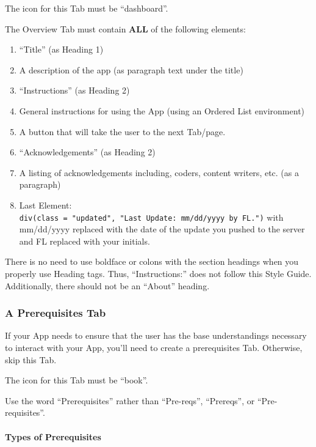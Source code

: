 \documentclass[
]{book}
\providecommand{\tightlist}{%
  \setlength{\itemsep}{0pt}\setlength{\parskip}{0pt}}
\begin{document}
The icon for this Tab must be ``dashboard''.

The Overview Tab must contain \textbf{ALL} of the following elements:

\begin{enumerate}
\def\labelenumi{\arabic{enumi}.}
\tightlist
\item
  ``Title'' (as Heading 1)
\item
  A description of the app (as paragraph text under the title)
\item
  ``Instructions'' (as Heading 2)
\item
  General instructions for using the App (using an Ordered List environment)
\item
  A button that will take the user to the next Tab/page.
\item
  ``Acknowledgements'' (as Heading 2)
\item
  A listing of acknowledgements including, coders, content writers, etc. (as a paragraph)
\item
  Last Element: \texttt{div(class\ =\ "updated",\ "Last\ Update:\ mm/dd/yyyy\ by\ FL.")} with mm/dd/yyyy replaced with the date of the update you pushed to the server and FL replaced with your initials.
\end{enumerate}

There is no need to use boldface or colons with the section headings when you properly use Heading tags. Thus, ``Instructions:'' does not follow this Style Guide. Additionally, there should not be an ``About'' heading.

\hypertarget{a-prerequisites-tab}{%
\subsubsection{A Prerequisites Tab}\label{a-prerequisites-tab}}

If your App needs to ensure that the user has the base understandings necessary to interact with your App, you'll need to create a prerequisites Tab. Otherwise, skip this Tab.

The icon for this Tab must be ``book''.

Use the word ``Prerequisites'' rather than ``Pre-reqs'', ``Prereqs'', or ``Pre-requisites''.

\hypertarget{types-of-prerequisites}{%
\paragraph{Types of Prerequisites}\label{types-of-prerequisites}}
\end{document}
